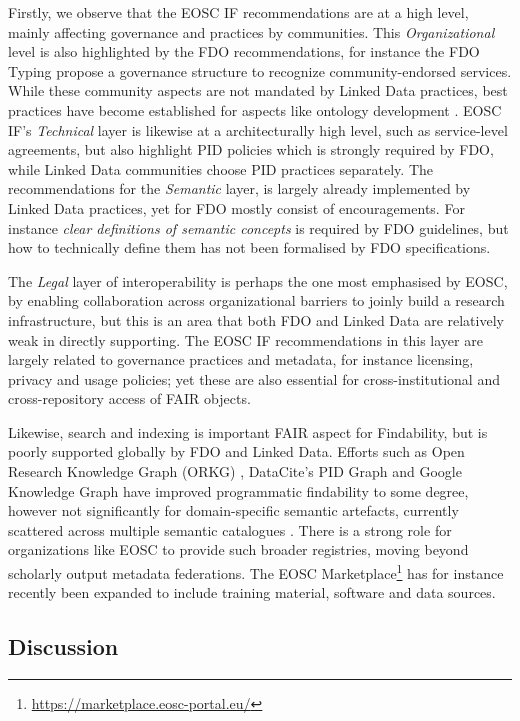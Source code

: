 Firstly, we observe that the EOSC IF recommendations are at a high level, mainly affecting governance and practices by communities. This \emph{Organizational} level is also highlighted by the FDO recommendations, for instance the FDO Typing \cite{fdo-TypingFDOs} propose a governance structure to recognize community-endorsed services. While these community aspects are not mandated by Linked Data practices, best practices have become established for aspects like ontology development \cite{10.1186/s13326-021-00240-6}. EOSC IF's \emph{Technical} layer is likewise at a architecturally high level, such as service-level agreements, but also highlight PID policies which is strongly required by FDO, while Linked Data communities choose PID practices separately. The recommendations for the \emph{Semantic} layer, is largely already implemented by Linked Data practices, yet for FDO mostly consist of encouragements. For instance \emph{clear definitions of semantic concepts} is required by FDO guidelines, but how to technically define them has not been formalised by FDO specifications. 

The \emph{Legal} layer of interoperability is perhaps the one most emphasised by EOSC, by enabling collaboration across organizational barriers to joinly build a research infrastructure, but this is an area that both FDO and Linked Data are relatively weak in directly supporting. The EOSC IF recommendations in this layer are largely related to governance practices and metadata, for instance licensing, privacy and usage policies; yet these are also essential for cross-institutional and cross-repository access of FAIR objects. 

Likewise, search and indexing is important FAIR aspect for Findability, but is poorly supported globally by FDO and Linked Data. Efforts such as Open Research Knowledge Graph (ORKG) \cite{10.1007/978-3-030-30760-8_31}, DataCite's PID Graph \cite{10.5438/jwvf-8a66} and Google Knowledge Graph \cite{singhal2012} have improved programmatic findability to some degree, however not significantly for domain-specific semantic artefacts, currently scattered across multiple semantic catalogues \cite{10.48550/arXiv.2305.06746}.  There is a strong role for organizations like EOSC to provide such broader registries, moving beyond scholarly output metadata federations. The EOSC Marketplace\footnote{\url{https://marketplace.eosc-portal.eu/}} has for instance recently been expanded to include training material, software and data sources.


\subsection{Discussion}\label{ch3:discussion}

